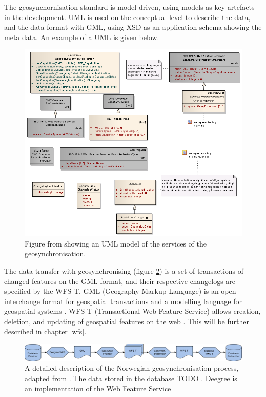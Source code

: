 The geosynchornisation standard is model driven, using models as key artefacts in the development.
UML is used on the conceptual level to describe the data, and the data format with GML, using XSD as an application schema showing the meta data. An example of a UML is given below.

\begin{figure}[H]
	\centering
	\includegraphics[scale=0.35]{img/uml.png}
	\caption{Figure from \cite{Kartverket2012a} showing an UML model of the services of the geosynchronisation.}
	\label{fig:uml}
\end{figure}

The data transfer with geosynchronising (figure \ref{fig:geosyncprocess}) is a set of transactions of changed features on the GML-format, and their respective changelogs are specified by the WFS-T.  GML (Geography Markup Language) is an open interchange format for geospatial transactions and a modelling language for geospatial systems \citep{OGC2017}. WFS-T (Transactional Web Feature Service) allows creation, deletion, and updating of geospatial features on the web \citep{OGCNetwork}. This will be further described in chapter \ref{wfs}. 

\begin{figure}[H]
	\centering
	\includegraphics[scale=0.43]{img/geosynkkk.png}
	\caption{A detailed description of the Norwegian geosynchronisation process, adapted from \cite{Eggan2017}. The data stored in the database TODO . Deegree is an implementation of the Web Feature Service}
	\label{fig:geosyncprocess}
\end{figure}

